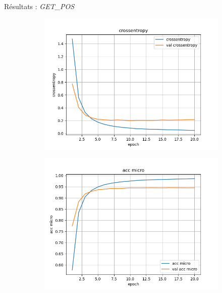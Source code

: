 \documentclass[11pt]{beamer}
\begin{document}
\begin{frame}{Résultats : \textit{GET\_POS}}
    \begin{figure}
        \centering
        \begin{subfigure}{0.32\textwidth}
            \centering
            \includegraphics[width=\linewidth]{../logs/get_pos/crossentropy.png}
        \end{subfigure}
        \begin{subfigure}{0.32\textwidth}
            \centering
            \includegraphics[width=\linewidth]{../logs/get_pos/acc micro.png}
        \end{subfigure}
        \begin{subfigure}{0.32\textwidth}

\end{subfigure}
\end{figure}
\end{frame}
\end{document}
